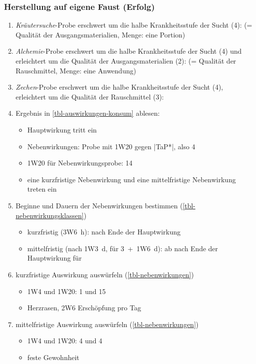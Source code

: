 \subsubsection{Herstellung auf eigene Faust (Erfolg)}
\begin{enumerate}
	\item \emph{Kräutersuche}-Probe erschwert um die halbe Krankheitsstufe der Sucht (4):  (= Qualität der Ausgangsmaterialien, Menge: eine Portion)
	\item \emph{Alchemie}-Probe erschwert um die halbe Krankheitsstufe der Sucht (4) und erleichtert um die Qualität der Ausgangsmaterialien (2):  (= Qualität der Rauschmittel, Menge: eine Anwendung)
	\item \emph{Zechen}-Probe erschwert um die halbe Krankheitsstufe der Sucht (4), erleichtert um die Qualität der Rauschmittel (3): 
	\item Ergebnis in \vref{tbl-auswirkungen-konsum} ablesen:
	\begin{itemize}
		\item Hauptwirkung tritt ein
		\item Nebenwirkungen: Probe mit 1W20 gegen |TaP*|, also 4
		\item 1W20 für Nebenwirkungsprobe: 14
		\item eine kurzfristige Nebenwirkung und eine mittelfristige Nebenwirkung treten ein
	\end{itemize}
	\item Beginne und Dauern der Nebenwirkungen bestimmen (\vref{tbl-nebenwirkungsklassen})
	\begin{itemize}
		\item kurzfristig (3W6~h):  nach Ende der Hauptwirkung
		\item mittelfristig (nach 1W3~d, für 3~+~1W6~d): ab  nach Ende der Hauptwirkung für 
	\end{itemize}
	\item kurzfristige Auswirkung auswürfeln (\vref{tbl-nebenwirkungen})
	\begin{itemize}
		\item 1W4 und 1W20: 1 und 15
		\item Herzrasen, 2W6 Erschöpfung pro Tag
	\end{itemize}
	\item mittelfristige Auswirkung auswürfeln (\vref{tbl-nebenwirkungen})
	\begin{itemize}
		\item 1W4 und 1W20: 4 und 4
		\item feste Gewohnheit
	\end{itemize}
\end{enumerate}

